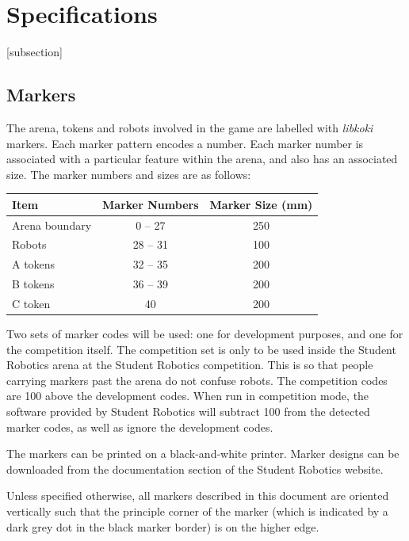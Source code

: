 \section{Specifications}
\label{sec:Specifications}

[subsection]
\newcommand{\rcnii}{\stepcounter{rulei}\arabic{section}.\arabic{subsection}.\arabic{rulei}}
\renewcommand{\labelenumi}{\rcnii}

\subsection{Markers}
\label{sub:markers}
The arena, tokens and robots involved in the game are labelled with \textit{libkoki} markers.
Each marker pattern encodes a number.
Each marker number is associated with a particular feature within the arena, and also has an associated size.
The marker numbers and sizes are as follows:

\begin{center}
  \begin{tabular}{lcc}
    \toprule
    \textbf{Item} & \textbf{Marker Numbers} & \textbf{Marker Size (mm)} \\
    \midrule
    Arena boundary & {} 0 -- 27 & 250 \\
    Robots & 28 -- 31 & 100 \\
    A tokens & 32 -- 35 & 200 \\
    B tokens & 36 -- 39 & 200 \\
    C token & 40 & 200 \\
    \bottomrule
  \end{tabular}
\end{center}

Two sets of marker codes will be used: one for development purposes, and one for the competition itself.
The competition set is only to be used inside the Student Robotics arena at the Student Robotics competition.
This is so that people carrying markers past the arena do not confuse robots.
The competition codes are 100 above the development codes.
When run in competition mode, the software provided by Student Robotics will subtract 100 from the detected marker codes, as well as ignore the development codes.

The markers can be printed on a black-and-white printer.
Marker designs can be downloaded from the documentation section of the Student Robotics website.

Unless specified otherwise, all markers described in this document are oriented vertically such that the principle corner of the marker (which is indicated by a dark grey dot in the black marker border) is on the higher edge.

